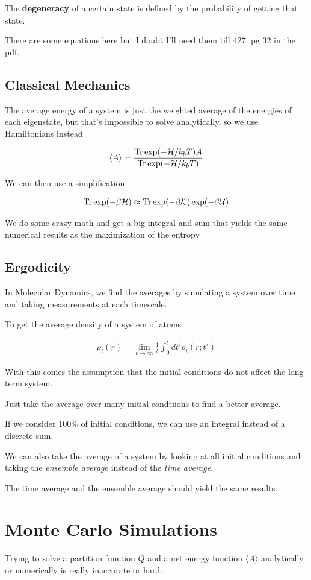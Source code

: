 \documentclass[fleqn]{report}
\newcommand{\equations} [1] {
\begin{gather*}
#1
\end{gather*}
}
\begin{document}
The \textbf{degeneracy} of a certain state is defined by the probability 
of getting that state.

There are some equations here but I doubt I'll need them till 427. pg 32 
in the pdf. 

\section{Classical Mechanics}
The average energy of a system is just the weighted average of the energies 
of each eigenstate, but that's impossible to solve analytically, so 
we use Hamiltonians instead 
\equations{
    \langle A \rangle 
    =
    \frac{\Tr \exp(- \mathcal H / k_b T) A} {\Tr \exp(- \mathcal H / k_b T)}
}
We can then use a simplification 
\equations{
    \Tr \exp(-\beta \mathcal H)
    \approx
    \Tr \exp(-\beta \mathcal K) \exp(- \beta \mathcal U)
}
We do some crazy math and get a big integral and sum that yields the same numerical 
results as the maximization of the entropy 

\section{Ergodicity}
In Molecular Dynamics, we find the averages by simulating a system over time 
and taking measurements at each timescale. 

To get the average density of a system of atoms 
\equations{
    \overline{\rho_i(r)}
    =
    \lim_{t \to \infty} \frac{1}{t} \int^t_0 dt' \rho_i(r; t')
}
With this comes the assumption that the initial conditions do not affect 
the long-term system.

Just take the average over many initial condtiions to find a better average. 

If we consider 100\% of initial conditions, we can use an integral instead of 
a discrete sum. 

We can also take the average of a system by looking at all initial conditions and 
taking the \textit{ensemble average} instead of the \textit{time average}.

The time average and the ensemble average should yield the same results.

\chapter{Monte Carlo Simulations}
Trying to solve a partition function $Q$ and a net energy function 
$\langle A \rangle$ analytically or numerically is really inaccurate or hard. 
\end{document}
